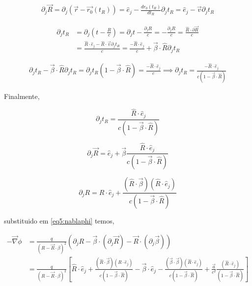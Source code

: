 \begin{equation}
	\begin{split}
		\partial_j \vec{R} = \partial_j (\vec{r}-\vec{r_0}(t_R)) = \hat{e}_j - \frac{dr_0(t_R)}{dt_R}\partial_j t_R = \hat{e}_j - \vec{v}\partial_j t_R
	\end{split}
\end{equation}

\begin{equation}
	\begin{split}
		\partial_j t_R &= \partial_j \left(t-\frac{R}{c}\right) = \partial_j t - \frac{\partial_j R}{c} =  -\frac{\partial_j R}{c} = \frac{\hat{R} \cdot \partial \vec{R}}{c} \\ & = \frac{\hat{R}\cdot\hat{e}_j - \hat{R}\cdot\vec{v}\partial_j t_R}{c} = \frac{-\hat{R}\cdot \hat{e}_j}{c} + \vec{\beta}\cdot\hat{R}\partial_j t_R
	\end{split}
\end{equation}

\begin{equation}
	\begin{split}
		\partial_j t_R-\vec{\beta}\cdot\hat{R}\partial_j t_R = \partial_j t_R(1-\vec{\beta}\cdot\hat{R}) = \frac{-\hat{R}\cdot \hat{e}_j}{c} \implies \partial_j t_R = \frac{-\hat{R}\cdot \hat{e}_j}{c(1-\vec{\beta}\cdot\hat{R})}
	\end{split}
\end{equation}


Finalmente,

\begin{equation}
	\partial_j t_R = \frac{\hat{R}\cdot \hat{e}_j}{c(1-\vec{\beta}\cdot\hat{R})}
\end{equation}

\begin{equation}
	\partial_j \vec{R} = \hat{e}_j + \vec{\beta}\frac{\hat{R}\cdot \hat{e}_j}{c(1-\vec{\beta}\cdot\hat{R})}
\end{equation}

\begin{equation}
	\partial_j R = \hat{R}\cdot\hat{e}_j + \frac{(\hat{R}\cdot\vec{\beta})(\hat{R}\cdot \hat{e}_j)}{c(1-\vec{\beta}\cdot\hat{R})}
\end{equation}

substituido em \ref{eq5:nablaphi} temos,

\begin{equation}
	\begin{split}
	-\vec{\nabla}\phi & =\frac{q}{(R-\vec{R}\cdot{\beta})^2}(\partial_j R -\vec{\beta}\cdot(\partial_j \vec{R}) - \vec{R}\cdot({\partial_j \vec{\beta}})) \\
	& = \frac{q}{(R-\vec{R}\cdot{\beta})^2}\left[\hat{R}\cdot\hat{e}_j + \frac{(\hat{R}\cdot\vec{\beta})(\hat{R}\cdot \hat{e}_j)}{c(1-\vec{\beta}\cdot\hat{R})} - \vec{\beta}\cdot\hat{e}_j - \frac{(\vec{\beta}\cdot\vec{\beta})(\hat{R}\cdot \hat{e}_j)}{c(1-\vec{\beta}\cdot\hat{R})} + \frac{\vec{a}}{c^2}\frac{(\hat{R}\cdot \hat{e}_j)}{(1-\vec{\beta}\cdot\hat{R})}\right]
	\end{split}
\end{equation}